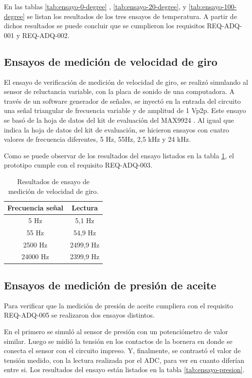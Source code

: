 En las tablas \ref{tab:ensayo-0-degree} , \ref{tab:ensayo-20-degree}, y \ref{tab:ensayo-100-degree} se listan los resultados de los tres ensayos de temperatura. A partir de dichos resultados se puede concluir que se cumplieron los requisitos REQ-ADQ-001 y REQ-ADQ-002.

\subsection{Ensayos de medición de velocidad de giro}

El ensayo de verificación de medición de velocidad de giro, se realizó simulando al sensor de reluctancia variable, con la placa de sonido de una computadora. A través de un software generador de señales, se inyectó en la entrada del circuito una señal triangular de frecuencia variable y de amplitud de 1 Vp2p. Este ensayo se basó de la hoja de datos del kit de evaluación del MAX9924 \cite{max9924evk}. Al igual que indica la hoja de datos del kit de evaluación, se hicieron ensayos con cuatro valores de frecuencia diferentes, 5 Hz, 55Hz, 2,5 kHz y 24 kHz.

Como se puede observar de los resultados del ensayo listados en la tabla \ref{tab:ensayo-rpm}, el prototipo cumple con el requisito REQ-ADQ-003.

\begin{table}[htpb]
	\centering
	\caption{Resultados de ensayo de medición de velocidad de giro.}
	\centering
	\begin{tabular}{c c}    
		\toprule
		\textbf{Frecuencia señal }     & \textbf{Lectura} \\
		\midrule
		5 Hz		&   5,1 Hz \\
		55 Hz		&   54,9 Hz \\
		2500 Hz		&   2499,9 Hz \\
		24000 Hz	&   2399,9 Hz \\
		\bottomrule
	\end{tabular}
	\label{tab:ensayo-rpm}
\end{table}

\subsection{Ensayos de medición de presión de aceite}

Para verificar que la medición de presión de aceite cumpliera con el requisito REQ-ADQ-005 se realizaron dos ensayos distintos.

En el primero se simuló al sensor de presión con un potenciómetro de valor similar. Luego se midió la tensión en los contactos de la bornera en donde se conecta el sensor con el circuito impreso. Y, finalmente, se contrastó el valor de tensión medido, con la lectura realizada por el ADC, para ver en cuanto diferían entre si. Los resultados del ensayo están listados en la tabla \ref{tab:ensayo-presion}.

